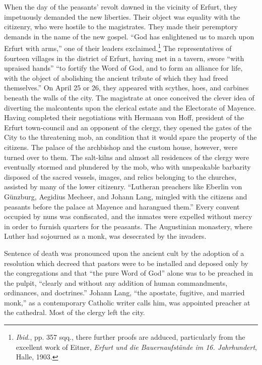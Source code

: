 When the day of the peasants’ revolt dawned in the vicinity of
Erfurt, they impetuously demanded the new liberties. Their object
was equality with the citizenry, who were hostile to the magistrates.
They made their peremptory demands in the name of the new
gospel. “God has enlightened us to march upon Erfurt with arms,”
one of their leaders exclaimed.\footnote
{\textit{Ibid.}, pp. 357 sqq., there further proofs are adduced, particularly from the excellent
work of Eitner, \textit{Erfurt und die Bauernaufstände im 16. Jahrhundert}, Halle, 1903.}
The representatives of fourteen
villages in the district of Erfurt, having met in a tavern, swore
“with upraised hands” “to fortify the Word of God, and to form
an alliance for life, with the object of abolishing the ancient tribute
of which they had freed themselves.” On April 25 or 26, they appeared
with scythes, hoes, and carbines beneath the walls of the
city. The magistrate at once conceived the clever idea of diverting
the malcontents upon the clerical estate and the Electorate of Mayence.
Having completed their negotiations with Hermann von Hoff, president
of the Erfurt town-council and an opponent of the clergy, they opened
the gates of the City to the threatening mob, an condition that it would
spare the property of the citizens. The palace of the archbishop and the
custom house, however, were turned over to them. The salt-kilns and almost
all residences of the clergy were eventually stormed and plundered by
the mob, who with unspeakable barbarity disposed of the sacred vessels,
images, and relics belonging to the churches, assisted by many of the
lower citizenry. ``Lutheran preachers like Eberlin von Günzburg, Aegidius
Mecheer, and Johann Lang, mingled with the citizens and peasants
before the palace at Mayence and harangued them.” Every convent
occupied by nuns was confiscated, and the inmates were expelled
without mercy in order to furnish quarters for the peasants. The
Augustinian monastery, where Luther had sojourned as a monk, was
desecrated by the invaders.

Sentence of death was pronounced upon the ancient cult by the
adoption of a resolution which decreed that pastors were to be installed
and deposed only by the congregations and that “the pure
Word of God” alone was to be preached in the pulpit, “clearly and
without any addition of human commandments, ordinances, and
doctrines.” Johann Lang, “the apostate, fugitive, and married monk,”
as a contemporary Catholic writer calls him, was appointed preacher
at the cathedral. Most of the clergy left the city.


